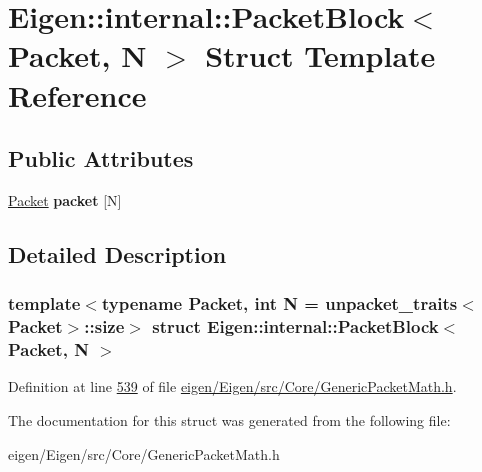 \hypertarget{struct_eigen_1_1internal_1_1_packet_block}{}\section{Eigen\+:\+:internal\+:\+:Packet\+Block$<$ Packet, N $>$ Struct Template Reference}
\label{struct_eigen_1_1internal_1_1_packet_block}
\subsection*{Public Attributes}
\begin{DoxyCompactItemize}
\item 
\mbox{\label{struct_eigen_1_1internal_1_1_packet_block_a1fd49fba6efc6632748080a1fef9380e}} 
\hyperlink{union_eigen_1_1internal_1_1_packet}{Packet} {\bfseries packet} \mbox{[}N\mbox{]}
\end{DoxyCompactItemize}


\subsection{Detailed Description}
\subsubsection*{template$<$typename Packet, int N = unpacket\+\_\+traits$<$\+Packet$>$\+::size$>$\newline
struct Eigen\+::internal\+::\+Packet\+Block$<$ Packet, N $>$}



Definition at line \hyperlink{eigen_2_eigen_2src_2_core_2_generic_packet_math_8h_source_l00539}{539} of file \hyperlink{eigen_2_eigen_2src_2_core_2_generic_packet_math_8h_source}{eigen/\+Eigen/src/\+Core/\+Generic\+Packet\+Math.\+h}.



The documentation for this struct was generated from the following file\+:\begin{DoxyCompactItemize}
\item 
eigen/\+Eigen/src/\+Core/\+Generic\+Packet\+Math.\+h\end{DoxyCompactItemize}
